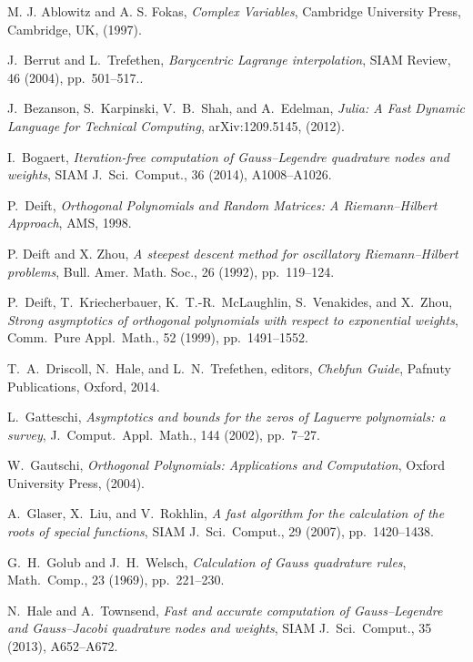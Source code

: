 \documentclass[final]{siamltex}
\begin{document}
\begin{thebibliography}{3}
{\sc M. J. Ablowitz and A. S. Fokas}, {\em Complex Variables}, {Cambridge University Press, Cambridge, UK}, (1997).

 {\sc J.\ Berrut and L.\ Trefethen}, {\em Barycentric Lagrange interpolation}, {SIAM Review}, 46 (2004), pp.~501--517..

 {\sc J.\ Bezanson, S.\ Karpinski, V.\ B.\ Shah, and A.\ Edelman}, {\em Julia: A Fast Dynamic Language for Technical Computing}, arXiv:1209.5145, (2012).

 {\sc I.\ Bogaert}, {\em Iteration-free computation of Gauss--Legendre quadrature nodes and weights}, {SIAM J.\ Sci.\ Comput.}, 36 (2014), A1008--A1026.

 {\sc P.\ Deift}, {\em Orthogonal Polynomials and Random Matrices: A Riemann--Hilbert Approach}, {AMS}, 1998.

 {\sc P. Deift and X. Zhou}, {\em A steepest descent method for oscillatory {Riemann--Hilbert} problems}, {Bull. Amer. Math. Soc.}, 26 (1992), pp.~119--124.

 {\sc P.\ Deift, T.\ Kriecherbauer, K.\ T.-R.\ McLaughlin, S.\ Venakides, and X.\ Zhou}, {\em  Strong asymptotics of orthogonal polynomials with respect to exponential weights}, {Comm.\ Pure Appl.\ Math.}, 52 (1999), pp.~1491--1552.

 {\sc T.\ A.\ Driscoll, N.\ Hale, and L.\ N.\ Trefethen}, {editors}, {\em Chebfun Guide}, {Pafnuty Publications}, {Oxford}, 2014. 

 {\sc L.\ Gatteschi}, {\em Asymptotics and bounds for the zeros of Laguerre polynomials: a survey}, {J.\ Comput.\ Appl.\ Math.}, 144 (2002), pp.~7--27. 

 {\sc W.\ Gautschi}, {\em Orthogonal Polynomials: Applications and Computation}, {Oxford University Press}, (2004).

 {\sc A.\ Glaser, X.\ Liu, and V.\ Rokhlin}, {\em A fast algorithm for the calculation of the roots of special functions}, {SIAM J.\ Sci.\ Comput.}, 29 (2007), pp.~1420--1438.

 {\sc G.\ H.\ Golub and J.\ H.\ Welsch}, {\em Calculation of Gauss quadrature rules}, {Math.\ Comp.}, 23 (1969), pp.~221--230.

 {\sc N.\ Hale and A.\ Townsend}, {\em Fast and accurate computation of Gauss--Legendre and Gauss--Jacobi quadrature nodes and weights}, {SIAM J.\ Sci.\ Comput.}, 35 (2013), A652--A672.


\end{thebibliography}
\end{document}
